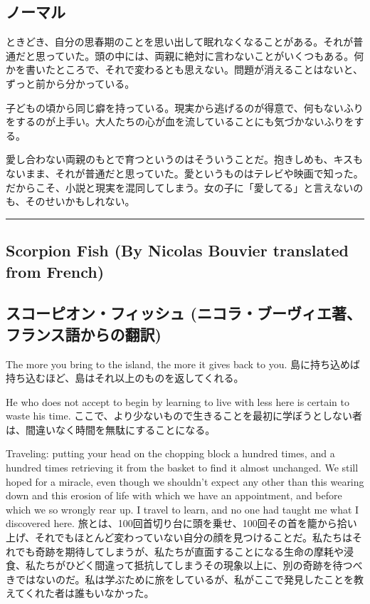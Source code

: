 \documentclass[
  letterpaper,
  oneside]{scrbook}
\begin{document}
\subsection{ノーマル}\label{ux30ceux30fcux30deux30eb}

ときどき、自分の思春期のことを思い出して眠れなくなることがある。それが普通だと思っていた。頭の中には、両親に絶対に言わないことがいくつもある。何かを書いたところで、それで変わるとも思えない。問題が消えることはないと、ずっと前から分かっている。

子どもの頃から同じ癖を持っている。現実から逃げるのが得意で、何もないふりをするのが上手い。大人たちの心が血を流していることにも気づかないふりをする。

愛し合わない両親のもとで育つというのはそういうことだ。抱きしめも、キスもないまま、それが普通だと思っていた。愛というものはテレビや映画で知った。だからこそ、小説と現実を混同してしまう。女の子に「愛してる」と言えないのも、そのせいかもしれない。

\begin{center}\rule{0.5\linewidth}{0.5pt}\end{center}

\subsection{Scorpion Fish (By Nicolas Bouvier translated from
French)}\label{scorpion-fish-by-nicolas-bouvier-translated-from-french}

\subsection{スコーピオン・フィッシュ
(ニコラ・ブーヴィエ著、フランス語からの翻訳)}\label{ux30b9ux30b3ux30fcux30d4ux30aaux30f3ux30d5ux30a3ux30c3ux30b7ux30e5-ux30cbux30b3ux30e9ux30d6ux30fcux30f4ux30a3ux30a8ux8457ux30d5ux30e9ux30f3ux30b9ux8a9eux304bux3089ux306eux7ffbux8a33}

The more you bring to the island, the more it gives back to you.
島に持ち込めば持ち込むほど、島はそれ以上のものを返してくれる。

He who does not accept to begin by learning to live with less here is
certain to waste his time.
ここで、より少ないもので生きることを最初に学ぼうとしない者は、間違いなく時間を無駄にすることになる。

Traveling: putting your head on the chopping block a hundred times, and
a hundred times retrieving it from the basket to find it almost
unchanged. We still hoped for a miracle, even though we shouldn't expect
any other than this wearing down and this erosion of life with which we
have an appointment, and before which we so wrongly rear up. I travel to
learn, and no one had taught me what I discovered here.
旅とは、100回首切り台に頭を乗せ、100回その首を籠から拾い上げ、それでもほとんど変わっていない自分の顔を見つけることだ。私たちはそれでも奇跡を期待してしまうが、私たちが直面することになる生命の摩耗や浸食、私たちがひどく間違って抵抗してしまうその現象以上に、別の奇跡を待つべきではないのだ。私は学ぶために旅をしているが、私がここで発見したことを教えてくれた者は誰もいなかった。
\end{document}
